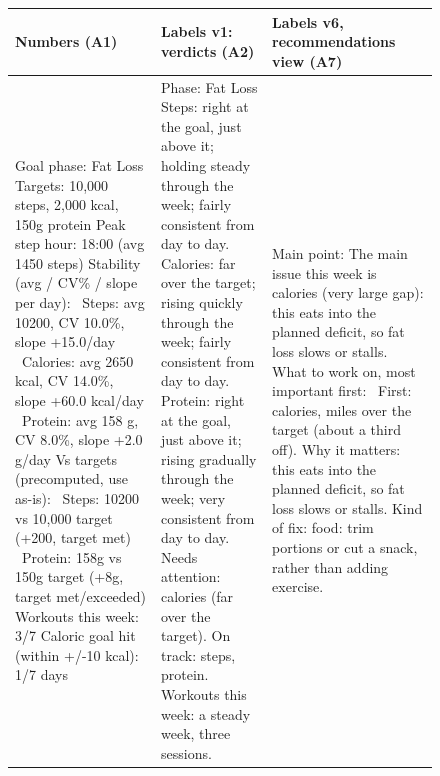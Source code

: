 \documentclass[10pt,twocolumn]{article}
\begin{document}
\begin{figure}[t]
\centering\scriptsize
\begin{tabular}{@{}p{}p{}p{}@{}}
\toprule
\textbf{Numbers (A1)} & \textbf{Labels v1: verdicts (A2)} & \textbf{Labels v6, recommendations view (A7)}\\
\midrule
\ttfamily Goal phase: Fat Loss\newline
Targets: 10,000 steps, 2,000 kcal, 150g protein\newline
Peak step hour: 18:00 (avg 1450 steps)\newline
Stability (avg / CV\% / slope per day):\newline
\ Steps: avg 10200, CV 10.0\%, slope +15.0/day\newline
\ Calories: avg 2650 kcal, CV 14.0\%, slope +60.0 kcal/day\newline
\ Protein: avg 158 g, CV 8.0\%, slope +2.0 g/day\newline
Vs targets (precomputed, use as-is):\newline
\ Steps: 10200 vs 10,000 target (+200, target met)\newline
\ Protein: 158g vs 150g target (+8g, target met/exceeded)\newline
Workouts this week: 3/7\newline
Caloric goal hit (within +/-10 kcal): 1/7 days
&
\ttfamily Phase: Fat Loss\newline
Steps: right at the goal, just above it; holding steady through the week; fairly consistent from day to day.\newline
Calories: far over the target; rising quickly through the week; fairly consistent from day to day.\newline
Protein: right at the goal, just above it; rising gradually through the week; very consistent from day to day.\newline
Needs attention: calories (far over the target).\newline
On track: steps, protein.\newline
Workouts this week: a steady week, three sessions.
&
\ttfamily Main point: The main issue this week is calories (very large gap): this eats into the planned deficit, so
fat loss slows or stalls.\newline
What to work on, most important first:\newline
\ First: calories, miles over the target (about a third off). Why it matters: this eats into the planned deficit,
so fat loss slows or stalls. Kind of fix: food: trim portions or cut a snack, rather than adding exercise.\newline

\end{tabular}
\end{figure}
\end{document}
